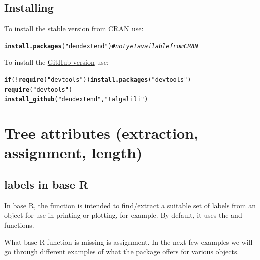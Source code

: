 \documentclass[shortnames,nojss,article]{jss}\usepackage[]{graphicx}\usepackage[]{color}
\makeatletter
\newcommand{\hlstr}[1]{\textcolor[rgb]{0.192,0.494,0.8}{#1}}%
\newcommand{\hlcom}[1]{\textcolor[rgb]{0.678,0.584,0.686}{\textit{#1}}}%
\newcommand{\hlopt}[1]{\textcolor[rgb]{0,0,0}{#1}}%
\newcommand{\hlstd}[1]{\textcolor[rgb]{0.345,0.345,0.345}{#1}}%
\newcommand{\hlkwa}[1]{\textcolor[rgb]{0.161,0.373,0.58}{\textbf{#1}}}%
\newcommand{\hlkwd}[1]{\textcolor[rgb]{0.737,0.353,0.396}{\textbf{#1}}}%
\newenvironment{kframe}{%
 \def\at@end@of@kframe{}%
 \ifinner\ifhmode%
  \def\at@end@of@kframe{\end{minipage}}%
  \begin{minipage}{\columnwidth}%
 \fi\fi%
 \def\FrameCommand##1{\hskip\@totalleftmargin \hskip-\fboxsep
 \colorbox{shadecolor}{##1}\hskip-\fboxsep
     \hskip-\linewidth \hskip-\@totalleftmargin \hskip\columnwidth}%
 \MakeFramed {\advance\hsize-\width
   \@totalleftmargin\z@ \linewidth\hsize
   \@setminipage}}%
 {\par\unskip\endMakeFramed%
 \at@end@of@kframe}
\newenvironment{knitrout}{}{} %
\makeatother
\begin{document}
\subsection{Installing }

To install the stable version from CRAN use:

\begin{knitrout}
\color{fgcolor}\begin{kframe}
\begin{alltt}
\hlkwd{install.packages}\hlstd{(}\hlstr{"dendextend"}\hlstd{)}  \hlcom{# not yet available from CRAN}
\end{alltt}
\end{kframe}
\end{knitrout}



To install the \href{https://github.com/talgalili/dendextend}{GitHub version} use:

\begin{knitrout}
\color{fgcolor}\begin{kframe}
\begin{alltt}
\hlkwa{if} \hlstd{(}\hlopt{!}\hlkwd{require}\hlstd{(}\hlstr{"devtools"}\hlstd{))} \hlkwd{install.packages}\hlstd{(}\hlstr{"devtools"}\hlstd{)}
\hlkwd{require}\hlstd{(}\hlstr{"devtools"}\hlstd{)}
\hlkwd{install_github}\hlstd{(}\hlstr{"dendextend"}\hlstd{,} \hlstr{"talgalili"}\hlstd{)}
\end{alltt}
\end{kframe}
\end{knitrout}



\section{Tree attributes (extraction, assignment, length)}


\subsection{labels in base R}

In base R, the  function is intended to find/extract a suitable set of labels from an object for use in printing or plotting, for example. By default, it uses the  and  functions.

What base R  function is missing is assignment. In the next few examples we will go through different examples of what the  package offers for various objects.
\end{document}
